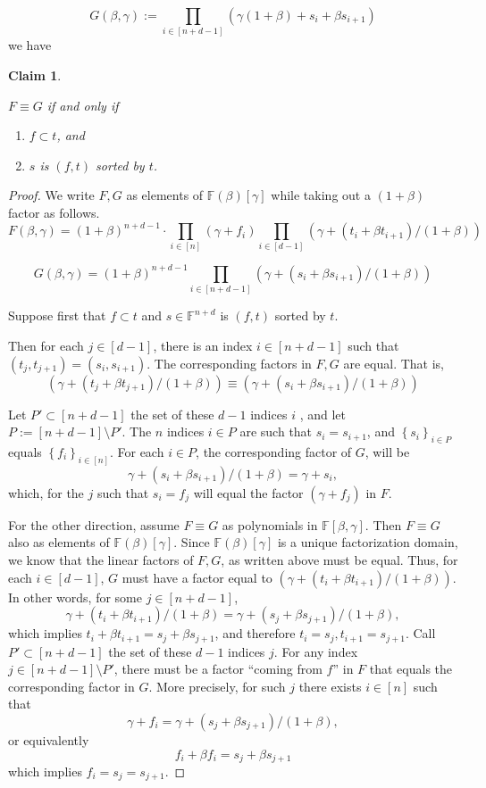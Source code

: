 \documentclass[11pt]{article} %
\newcommand{\F}{\ensuremath{\mathbb F}\xspace}
\newcommand{\defeq}{:=}
\newcommand{\sett}[2]{\ensuremath{\set{#1}_{#2}}\xspace}
\newcommand{\set}[1]{\ensuremath{\left\{#1\right\}}\xspace}
\newtheorem{claim}[lemma]{Claim}
\begin{document}
\[G(\beta,\gamma) \defeq \prod_{i\in [n+d-1]} \left( \gamma(1+\beta) + s_i + \beta s_{i+1} \right)\]
we have
\begin{claim}\label{clm:main_lookup}

 $F\equiv G$ if and only if 
 \begin{enumerate}
  \item $f \subset t$, and 
  \item $s$ is $(f,t)$ sorted by $t$. 
 \end{enumerate}

\end{claim}
\begin{proof}
 We write $F,G$ as elements of $\F(\beta)[\gamma]$ while taking out a $(1+\beta)$ factor as follows.
\[F(\beta,\gamma) = (1+\beta)^{n+d-1}\cdot \prod_{i\in [n]} (\gamma + f_i) \prod_{i\in [d-1]} \left(\gamma + (t_i + \beta t_{i+1})/(1+\beta)\right)\]
                                  
\[G(\beta,\gamma)  = (1+\beta)^{n+d-1} \prod_{i\in [n+d-1]} \left( \gamma+ (s_i + \beta s_{i+1})/(1+\beta) \right)\]
 
 
 Suppose first that $f\subset t$ and $s\in \F^{n+d}$ is $(f,t)$ sorted by $t$.

 Then for each $j\in [d-1]$, there is an index $i\in [n+d-1]$ such that
 $ (t_j,t_{j+1})=(s_i,s_{i+1})$.
 The corresponding factors in $F,G$ are equal. That is,
 \[(\gamma + (t_j + \beta t_{j+1})/(1+\beta)) \equiv (\gamma + (s_i + \beta s_{i+1})/(1+\beta))\]

 Let $P'\subset [n+d-1]$ the set of these $d-1$ indices $i$
 , and let $P\defeq [n+d-1]\setminus P'$.
 The $n$ indices $i\in P$ are such 
 that $s_i=s_{i+1}$, and $\sett{s_i}{i\in P}$ equals $\sett{f_i}{i\in [n]}$. For each $i\in P$, the corresponding factor of $G$, will be
 \[ \gamma + (s_i + \beta s_{i+1})/(1+\beta)= \gamma + s_i,\]
 which, for the $j$ such that $s_i =f_j$ will equal the factor $(\gamma + f_j)$ in $F$.
 
 
 For the other direction, assume $F\equiv G$ as polynomials in $\F[\beta,\gamma]$.  
 Then $F\equiv G$ also as elements of $\F(\beta)[\gamma]$.
 Since $\F(\beta)[\gamma]$ is a unique factorization domain, we know that the linear factors of $F,G$, as written above must be equal.
 Thus, for each $i\in [d-1]$, $G$ must have a factor equal to $(\gamma + (t_i + \beta t_{i+1})/(1+\beta))$.
 In other words, for some $j\in [n+d-1]$, 
 \[\gamma + (t_i + \beta t_{i+1})/(1+\beta)= \gamma+ (s_j + \beta s_{j+1})/(1+\beta),\]
 which implies $t_i + \beta t_{i+1}= s_j + \beta s_{j+1}$, and therefore $t_i= s_j, t_{i+1}=s_{j+1}$.
Call $P'\subset [n+d-1]$ the set of these $d-1$ indices $j$.
 For any index $j\in [n+d-1]\setminus P'$, there must be a factor ``coming from $f$'' in $F$ that equals the corresponding factor in $G$. More precisely, for such $j$ there exists $i\in [n]$ such that
 \[\gamma + f_i = \gamma+ (s_j + \beta s_{j+1})/(1+\beta),\]
 or equivalently
 \[f_i+ \beta f_i = s_j + \beta s_{j+1}\]
 which implies
 $f_i= s_j=s_{j+1}$.
 

\end{proof}
\end{document}
